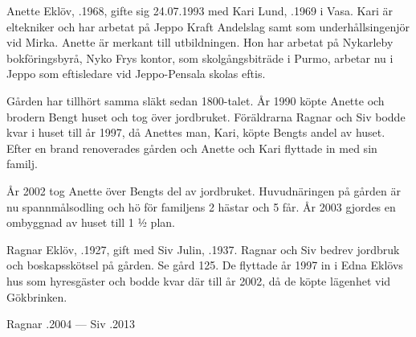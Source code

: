 %
Anette Eklöv, .1968, gifte sig 24.07.1993 med Kari Lund, .1969 i Vasa. Kari är eltekniker och har arbetat på Jeppo Kraft Andelslag samt som underhållsingenjör vid Mirka. Anette är merkant till utbildningen. Hon 	har arbetat på Nykarleby bokföringsbyrå, Nyko Frys kontor, som skolgångsbiträde i Purmo, arbetar nu i Jeppo som eftisledare vid Jeppo-Pensala skolas eftis.
\begin{jhchildren}
  \item {}
  \item {}
  \item {}
\end{jhchildren}

Gården har tillhört samma släkt sedan 1800-talet. År 1990 köpte Anette och brodern Bengt huset och tog över jordbruket. Föräldrarna Ragnar och Siv bodde kvar i huset till år 1997, då Anettes man, Kari, köpte Bengts andel av huset. Efter en brand renoverades gården och Anette och Kari flyttade in med sin familj.

År 2002 tog Anette över Bengts del av jordbruket. Huvudnäringen på gården är nu spannmålsodling och hö för familjens 2 hästar och 5 får. År 2003 gjordes en ombyggnad av huset till 1 ½ plan.


%
Ragnar Eklöv, .1927, gift med Siv Julin, .1937. Ragnar och Siv bedrev jordbruk och boskapsskötsel på gården. Se gård 125. De flyttade år 1997 in i Edna Eklövs hus som hyresgäster och bodde kvar där till år 2002, då de köpte lägenhet vid Gökbrinken.

Ragnar .2004  ---  Siv .2013


%



